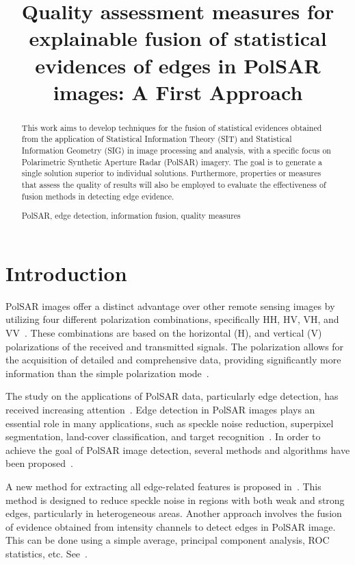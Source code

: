 \documentclass{article}
\title{Quality assessment measures for explainable fusion of statistical evidences of edges in PolSAR images: A First Approach}
\begin{document}
%
\maketitle
%
\begin{abstract}
This work aims to develop techniques for the fusion of statistical evidences obtained from the application of Statistical Information Theory (SIT) and Statistical Information Geometry (SIG) in image processing and analysis, with a specific focus on Polarimetric Synthetic Aperture Radar (PolSAR) imagery. The goal is to generate a single solution superior to individual solutions. Furthermore, properties or measures that assess the quality of results will also be employed to evaluate the effectiveness of fusion methods in detecting edge evidence.

%
\begin{keywords}
PolSAR, edge detection,  information fusion,  quality
measures 
\end{keywords}
%
\end{abstract}
\section{Introduction}
PolSAR images offer a distinct advantage over other remote sensing images by utilizing four different polarization combinations, specifically HH, HV, VH, and VV~\cite{Hua2022}. These combinations are based on the horizontal (H), and vertical (V) polarizations of the received and transmitted signals. The polarization allows for the acquisition of detailed and comprehensive data, providing significantly more information than the simple polarization mode~\cite{Zhai2015}.\par


The study on the applications of PolSAR data, particularly edge detection, has received increasing attention~\cite{Jin2016,Wang2018}. Edge detection in PolSAR images plays an essential role in many applications, such as speckle noise reduction, superpixel segmentation, land-cover classification, and target recognition~\cite{Xiang2016}. In order to achieve the goal of PolSAR image detection, several methods and algorithms have been proposed~\cite{Schou2003,Gambini2007,Nascimento2014}. \par


A new method for extracting all edge-related features is proposed in~\cite{Shi2020}. This method is designed to reduce speckle noise in regions with both weak and strong edges, particularly in heterogeneous areas. Another approach involves the fusion of evidence obtained from intensity channels to detect edges in PolSAR image. This can be done using a simple average, principal component analysis, ROC statistics, etc. See~\cite{DeBorba2020}. 
\end{document}
